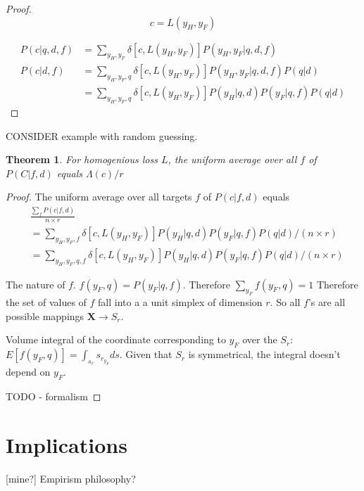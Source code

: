 \documentclass[a4paper]{article}
\newtheorem{theorem}{Theorem}[section]
\begin{document}
\begin{proof}
\begin{equation}
  c = L\left(y_H, y_F\right)
\end{equation}

\begin{equation}
\begin{split}
  P\left(c|q,d,f\right)& = \sum_{y_H,y_F} \delta\left[c,L\left(y_H,
      y_F\right)\right] P\left(y_H, y_F| q,d,f\right) \\
  P\left(c|d,f\right) & = \sum_{y_H,y_F,q} \delta\left[c,L\left(y_H,
      y_F\right)\right] P\left(y_H, y_F|q, d,f\right) P\left(q|d\right) \\
  & = \sum_{y_H,y_F,q} \delta\left[c,L\left(y_H, y_F\right)\right]
  P\left(y_H|q,d\right) P\left(y_F|q,f\right) P\left(q|d\right)
\end{split}
\end{equation}
\end{proof}
CONSIDER example with random guessing.

\begin{theorem}
  For homogenious loss $L$, the uniform average over all $f$ of
  $P\left(C|f,d\right)$ equals $\Lambda\left(c\right)/r$
\end{theorem}

\begin{proof}
  The uniform average over all targets $f$ of $P\left(c|f,d\right)$ equals
  \begin{equation}
    \begin{split}
      & \frac{\sum_f P\left(c|f,d\right)}{n\times r} \\
      & = \sum_{y_H,y_F,f} \delta\left[c,L\left(y_H, y_F\right)\right]
      P\left(y_H|q,d\right) P\left(y_F|q,f\right) P\left(q|d\right) /
      \left(n\times r\right) \\
      & =  \sum_{y_H,y_F,q,f} \delta\left[c,L\left(y_H, y_F\right)\right]
      P\left(y_H|q,d\right) P\left(y_F|q,f\right) P\left(q|d\right) /
      \left(n\times r\right)
    \end{split}
  \end{equation}

  The nature of $f$.  $f(y_F, q) = P\left(y_F|q,f\right)$. Therefore
  $\sum_{y_F} f(y_F, q) =1$ Therefore the set of values of $f$ fall
  into a a unit simplex of dimension $r$. So all $f$'s are all
  possible mappings $\mathbf{X} \rightarrow S_r$.

  Volume integral of the coordinate corresponding to $y_F$ over the
  $S_r$: $E\left[f(y_F, q)\right] = \int_{s_r} s_{r_{y_F}} ds$. Given
  that $S_r$ is symmetrical, the integral doesn't depend on $y_F$.
  
  TODO - formalism
\end{proof}

\section{Implications}
[mine?] Empirism philosophy?
\end{document}
